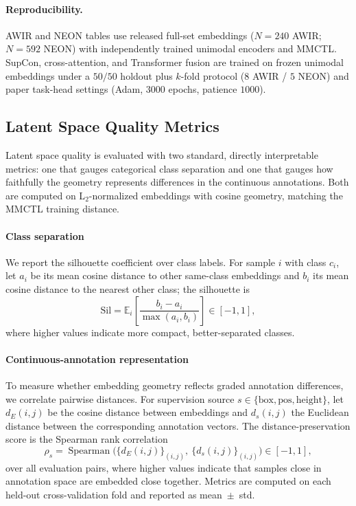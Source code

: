 \documentclass[lettersize,journal]{IEEEtran}
\begin{document}
\paragraph{Reproducibility.}
AWIR and NEON tables use released full-set embeddings ($N{=}240$ AWIR; $N{=}592$ NEON) with independently trained unimodal encoders and MMCTL. SupCon, cross-attention, and Transformer fusion are trained on frozen unimodal embeddings under a $50/50$ holdout plus $k$-fold protocol ($8$ AWIR / $5$ NEON) and paper task-head settings (Adam, $3000$ epochs, patience $1000$).

\subsection{Latent Space Quality Metrics}
\label{sec:latent_space_quality_metrics}
{\color{red}
Latent space quality is evaluated with two standard, directly interpretable metrics: one that gauges categorical class separation and one that gauges how faithfully the geometry represents differences in the continuous annotations. Both are computed on L$_2$-normalized embeddings with cosine geometry, matching the MMCTL training distance.

\paragraph{Class separation}
We report the silhouette coefficient over class labels. For sample $i$ with class $c_i$, let $a_i$ be its mean cosine distance to other same-class embeddings and $b_i$ its mean cosine distance to the nearest other class; the silhouette is
\begin{equation}
\label{eq:silhouette}
\mathrm{Sil}
=
\mathbb{E}_i\!\left[
\frac{b_i - a_i}{\max(a_i, b_i)}
\right]
\in [-1, 1],
\end{equation}
where higher values indicate more compact, better-separated classes.

\paragraph{Continuous-annotation representation}
To measure whether embedding geometry reflects graded annotation differences, we correlate pairwise distances. For supervision source $s \in \{\mathrm{box}, \mathrm{pos}, \mathrm{height}\}$, let $d_E(i,j)$ be the cosine distance between embeddings and $d_s(i,j)$ the Euclidean distance between the corresponding annotation vectors. The distance-preservation score is the Spearman rank correlation
\begin{equation}
\label{eq:spearman}
\rho_s
=
\operatorname{Spearman}\big(
\{ d_E(i,j) \}_{(i,j)},\
\{ d_s(i,j) \}_{(i,j)}
\big)
\in [-1, 1],
\end{equation}
over all evaluation pairs, where higher values indicate that samples close in annotation space are embedded close together. Metrics are computed on each held-out cross-validation fold and reported as mean~$\pm$~std.
}
\end{document}
